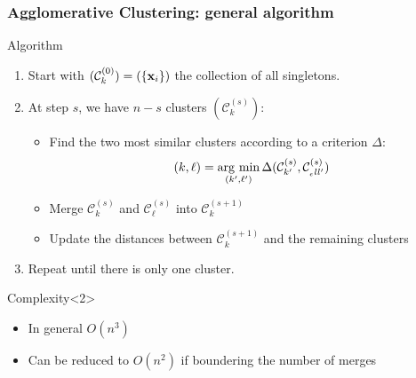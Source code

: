\documentclass{beamer}\usepackage[]{graphicx}\usepackage[]{color}
\begin{document}
\begin{frame}
  \frametitle{Agglomerative Clustering: general algorithm}

  \begin{block}{Algorithm}
    \vspace{-.25cm}
    \begin{enumerate}
      \item Start with $(\mathcal{C}_k^{(0)})= (\{ \mathbf{x}_i \})$ the collection of all singletons.
      \item At step $s$, we have $n-s$ clusters $(\mathcal{C}_{k}^{(s)})$:

      \begin{itemize}
        \item Find the two most similar clusters according to a criterion $\Delta$:%
        \begin{align*}
          (k,\ell) = \mathop{\mathrm{arg\ min}}_{(k',\ell')} \Delta(\mathcal{C}_{k'}^{(s)},\mathcal{C}_{_ell'}^{(s)})
        \end{align*}
        \item Merge $\mathcal{C}_{k}^{(s)}$ and $\mathcal{C}_{\ell}^{(s)}$ into $\mathcal{C}_{k}^{(s+1)}$
        \item Update the distances between $\mathcal{C}_{k}^{(s+1)}$ and the remaining clusters
      \end{itemize}
  
      \item Repeat until there is only one cluster.
    \end{enumerate}
  \end{block}

  \vfill

  \begin{block}{Complexity}<2>
    \vspace{-.25cm}
    \begin{itemize}
      \item In general $O(n^3)$
      \item Can be reduced to $O(n^2)$ if boundering the number of merges
    \end{itemize}
  \end{block}
  
\end{frame}
\end{document}
